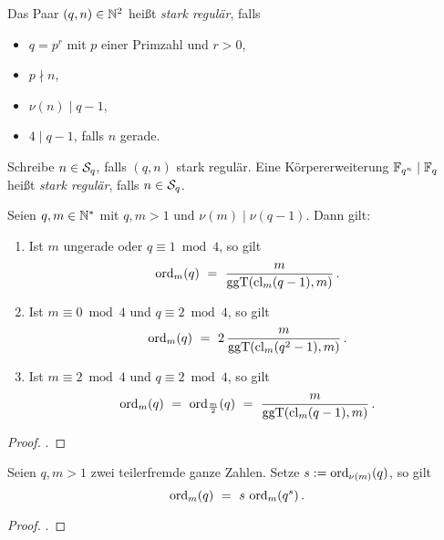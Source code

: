 \begin{definition}
  \label{def:stark_regular}
  Das Paar $(q,n) \in \N^2$ heißt \emph{stark regulär}, falls
  \begin{itemize}
    \item $q = p^r$ mit $p$ einer Primzahl und $r>0$,
    \item $p \nmid n$,
    \item $\nu(n) \mid q-1$,
    \item $4 \mid q-1$, falls $n$ gerade.
  \end{itemize}
  Schreibe $n \in \S_q$, falls $(q,n)$ stark regulär.
  Eine Körpererweiterung $\F_{q^n} \mid \F_q$ heißt \emph{stark regulär}, falls
  $n \in \S_q$.
\end{definition}

\begin{lemma}
  \label{lemma:ordn_1}
  Seien $q,m \in \N^\ast$ mit $q,m > 1$ und $\nu(m) \mid \nu(q-1)$. Dann gilt:
  \begin{enumerate}
    \item Ist $m$ ungerade oder $q\equiv 1 \bmod 4$, so gilt
      \[ \ord_m(q) \speq= \frac{m}{\ggT(\cl_m(q-1),m)}\,.\]
    \item Ist $m\equiv 0\bmod 4$ und $q\equiv 2 \bmod 4$, so gilt
      \[ \ord_m(q) \speq= 2\,\frac{m}{\ggT(\cl_m(q^2-1),m)}\,.\]
    \item Ist $m\equiv 2\bmod 4$ und $q\equiv 2 \bmod 4$, so gilt
      \[ \ord_m(q) \speq= \ord_{\frac m 2}(q) \speq=
        \frac{m}{\ggT(\cl_m(q-1),m)}\,.\]
  \end{enumerate}
\end{lemma}
\begin{proof}
  \autocite[Lemma 19.6]{hachenberger1997finite}.
\end{proof}

\begin{lemma}
  \label{lemma:ordn_2}
  Seien $q,m>1$ zwei teilerfremde ganze Zahlen. Setze 
  $s :=\ord_{\nu(m)}(q)$, so gilt
  \[ \ord_m(q) \speq= s\,\ord_m(q^s)\,.\]
\end{lemma}
\begin{proof}
  \autocite[Lemma 19.7]{hachenberger1997finite}.
\end{proof}

